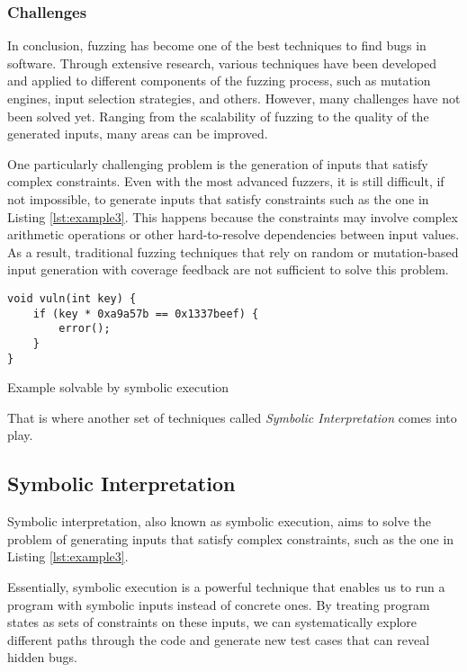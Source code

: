 \subsubsection{Challenges} \label{fuzzing:challenges}

In conclusion, fuzzing has become one of the best techniques to find bugs in software. Through extensive research, various techniques have been developed and applied to different components of the fuzzing process, such as mutation engines, input selection strategies, and others. However, many challenges have not been solved yet. Ranging from the scalability of fuzzing to the quality of the generated inputs, many areas can be improved.

One particularly challenging problem is the generation of inputs that satisfy complex constraints. Even with the most advanced fuzzers, it is still difficult, if not impossible, to generate inputs that satisfy constraints such as the one in Listing \ref{lst:example3}. This happens because the constraints may involve complex arithmetic operations or other hard-to-resolve dependencies between input values. As a result, traditional fuzzing techniques that rely on random or mutation-based input generation with coverage feedback are not sufficient to solve this problem.

\begin{listing}[htp]
	\centering
	\begin{minipage}{.6\linewidth}
		\begin{verbatim}
void vuln(int key) {
	if (key * 0xa9a57b == 0x1337beef) {
		error();
	}
}
		\end{verbatim}
	\end{minipage}
	\caption{Example solvable by symbolic execution}
	\label{lst:example3}
\end{listing}

That is where another set of techniques called \textit{Symbolic Interpretation} comes into play.

\subsection{Symbolic Interpretation}

Symbolic interpretation, also known as symbolic execution, aims to solve the problem of generating inputs that satisfy complex constraints, such as the one in Listing \ref{lst:example3}.

Essentially, symbolic execution is a powerful technique that enables us to run a program with symbolic inputs instead of concrete ones. By treating program states as sets of constraints on these inputs, we can systematically explore different paths through the code and generate new test cases that can reveal hidden bugs.


